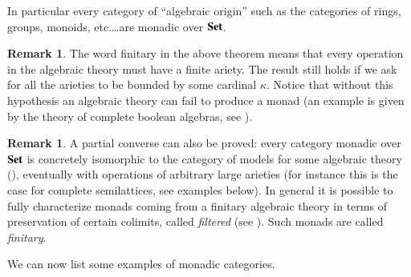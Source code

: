 \documentclass[12pt]{article}
\theoremstyle{definition}
\newtheorem{remark}[lemma]{Remark}
\newcommand{\Set}{\textbf{\textup{Set}}}
\numberwithin{equation}{section}
\begin{document}
In particular every category of ``algebraic origin'' such as the categories of rings, groups, monoids, etc.\dots are monadic over $\Set$.

\begin{remark} The word finitary in the above theorem means that every operation in the algebraic theory must have a finite ariety. The result still holds if we ask for all the arieties to be bounded by some cardinal $\kappa$. Notice that without this hypothesis an algebraic theory can fail to produce a monad (an example is given by the theory of complete boolean algebras, see \cite{stone}). 
\end{remark}

\begin{remark}\label{equational}A partial converse can also be proved: every category monadic over $\Set$ is concretely isomorphic to the category of models for some algebraic theory (\cite{linton2,linton3,stone}), eventually with operations of arbitrary large arieties (for instance this is the case for complete semilattices, see examples below). In general it is possible to fully characterize monads coming from a finitary algebraic theory in terms of preservation of certain colimits, called \emph{filtered} (see \cite{pres,algth} ). Such monads are called \emph{finitary}.
\end{remark}
 
We can now list some examples of monadic categories.
\end{document}
